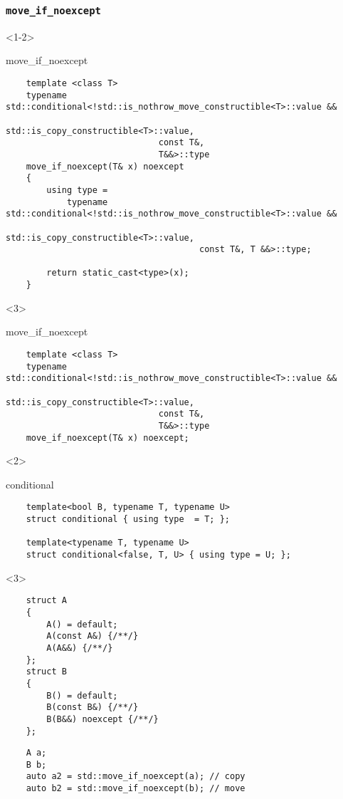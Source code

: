 \documentclass{beamer}
\begin{document}
\begin{frame}[fragile,t]
\frametitle{\texttt{move\_if\_noexcept}}
    \begin{onlyenv}<1-2>
    \begin{block}{move\_if\_noexcept}
    \begin{lstlisting}
    template <class T>
    typename std::conditional<!std::is_nothrow_move_constructible<T>::value &&
                                  std::is_copy_constructible<T>::value,
                              const T&,
                              T&&>::type
    move_if_noexcept(T& x) noexcept
    {
        using type =
            typename std::conditional<!std::is_nothrow_move_constructible<T>::value &&
                                          std::is_copy_constructible<T>::value,
                                      const T&, T &&>::type;

        return static_cast<type>(x);
    }
    \end{lstlisting}
    \end{block}
    \end{onlyenv}

    \begin{onlyenv}<3>
    \begin{block}{move\_if\_noexcept}
    \begin{lstlisting}
    template <class T>
    typename std::conditional<!std::is_nothrow_move_constructible<T>::value &&
                                  std::is_copy_constructible<T>::value,
                              const T&,
                              T&&>::type
    move_if_noexcept(T& x) noexcept;
    \end{lstlisting}
    \end{block}
    \end{onlyenv}
    
    \begin{onlyenv}<2>
    \begin{block}{conditional}
    \begin{lstlisting}
    template<bool B, typename T, typename U>
    struct conditional { using type  = T; };
    
    template<typename T, typename U>
    struct conditional<false, T, U> { using type = U; };
    \end{lstlisting}
    \end{block}
    \end{onlyenv}

    \begin{onlyenv}<3>
    \begin{lstlisting}
    struct A
    {
        A() = default;
        A(const A&) {/**/}
        A(A&&) {/**/}
    };
    struct B
    {
        B() = default;
        B(const B&) {/**/}
        B(B&&) noexcept {/**/}
    };
    \end{lstlisting}
    \hrulefill
    \begin{lstlisting}
    A a;
    B b;
    auto a2 = std::move_if_noexcept(a); // copy
    auto b2 = std::move_if_noexcept(b); // move
    \end{lstlisting}
    \end{onlyenv}
\end{frame}
\end{document}
